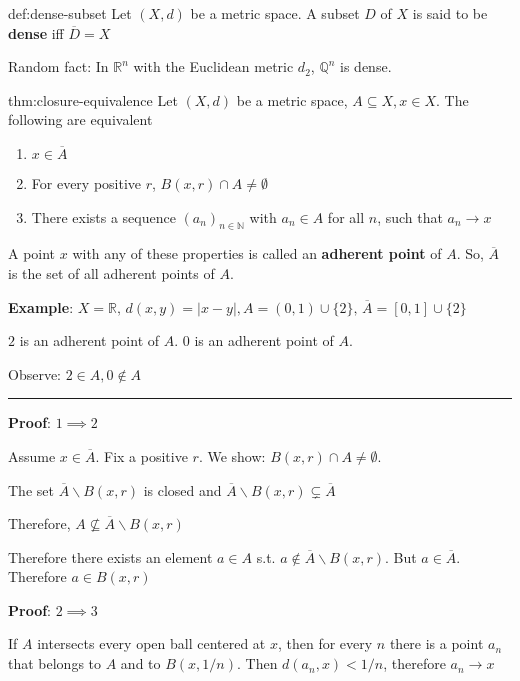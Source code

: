 \documentclass{article}
\begin{document}
\begin{dfn}{def:dense-subset}{}
    Let $(X, d)$ be a metric space. A subset $D$ of $X$ is said to be \textbf{dense} iff $\overline{D} = X$
\end{dfn}

Random fact: In $\mathbb{R}^{n}$ with the Euclidean metric $d_{2}$, $\mathbb{Q}^{n}$ is dense.

\newpage
\begin{thm}{thm:closure-equivalence}{}
    Let $(X, d)$ be a metric space, $A \subseteq X, x\in X$. The following are equivalent
    \begin{enumerate}
        \item $x\in\overline{A}$
        \item For every positive $r$, $B(x,r) \cap A \ne \emptyset$
        \item There exists a sequence $(a_{n})_{n\in \mathbb{N}}$ with $a_{n}\in A$ for all $n$, such that $a_{n}\to x$
    \end{enumerate}
    A point $x$ with any of these properties is called an \textbf{adherent point} of $A$. So, $\overline{A}$ is the set of all adherent points of $A$.
\end{thm}

\textbf{Example}: $X = \mathbb{R},\,d(x,y) = \lvert x - y \rvert, A = (0,1)\cup \{2\},\, \overline{A} = [0,1] \cup \{2\}$

$2$ is an adherent point of $A$. $0$ is an adherent point of $A$.

Observe: $2\in A, 0\not\in A$

\noindent\rule{\textwidth}{0.2pt}
\textbf{Proof}: $1 \implies 2$

Assume $x\in \overline{A}$. Fix a positive $r$. We show: $B(x,r)\cap A\ne \emptyset$.

The set $\overline{A} \backslash B(x,r)$ is closed and $\overline{A} \backslash B(x,r) \subsetneq \overline{A}$

Therefore, $A \not \subseteq \overline{A} \backslash B(x,r)$

Therefore there exists an element $a\in A$ s.t. $a\not\in \overline{A} \backslash B(x,r)$. But $a\in \overline{A}$. Therefore $a\in B(x,r)$

\textbf{Proof}: $2 \implies 3$

If $A$ intersects every open ball centered at $x$, then for every $n$ there is a point $a_{n}$ that belongs to $A$ and to $B(x, 1 /n)$. Then $d(a_{n}, x) < 1 /n$, therefore $a_{n}\to x$
\end{document}
